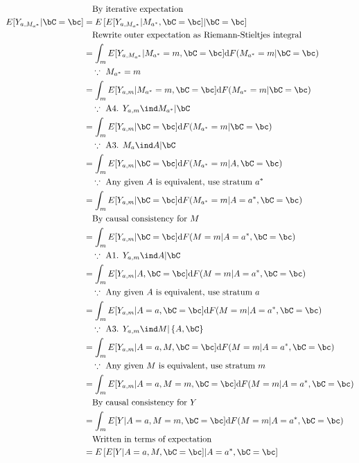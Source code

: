 \documentclass[10pt]{article}
\begin{document}
\begin{align*}
  &~~~\text{By iterative expectation}\\
  E[Y_{a,M_{a^{*}}} | \bC = \bc]
  &= E \left[ E[Y_{a,M_{a^{*}}} | M_{a^{*}}, \bC = \bc] | \bC = \bc \right]\\
  &~~~\text{Rewrite outer expectation as Riemann-Stieltjes integral}\\
  &= \int_{m} E[Y_{a,M_{a^{*}}} | M_{a^{*}} = m, \bC = \bc] \mathrm{d}F(M_{a^{*}} = m | \bC = \bc) \\
  &~~~\because~ M_{a^{*}} = m\\
  &= \int_{m} E[Y_{a,m} | M_{a^{*}} = m, \bC = \bc] \mathrm{d}F(M_{a^{*}} = m | \bC = \bc) \\
  &~~~\because~ \text{A4. } Y_{a,m} \ind M_{a^{*}} |\bC\\
  &= \int_{m} E[Y_{a,m} | \bC = \bc] \mathrm{d}F(M_{a^{*}} = m | \bC = \bc) \\
  &~~~\because~ \text{A3. } M_{a} \ind A | \bC\\
  &= \int_{m} E[Y_{a,m} | \bC = \bc] \mathrm{d}F(M_{a^{*}} = m | A, \bC = \bc) \\
  &~~~\because~ \text{Any given $A$ is equivalent, use stratum }a^{*}\\
  &= \int_{m} E[Y_{a,m} | \bC = \bc] \mathrm{d}F(M_{a^{*}} = m | A = a^{*}, \bC = \bc) \\
  &~~~\text{By causal consistency for }M\\
  &= \int_{m} E[Y_{a,m} | \bC = \bc] \mathrm{d}F(M = m | A = a^{*}, \bC = \bc) \\
  &~~~\because~ \text{A1. } Y_{a,m} \ind A | \bC\\
  &= \int_{m} E[Y_{a,m} | A, \bC = \bc] \mathrm{d}F(M = m | A = a^{*}, \bC = \bc) \\
  &~~~\because~ \text{Any given $A$ is equivalent, use stratum }a\\
  &= \int_{m} E[Y_{a,m} | A = a, \bC = \bc] \mathrm{d}F(M = m | A = a^{*}, \bC = \bc) \\
  &~~~\because~ \text{A3. } Y_{a,m} \ind M | \left\{ A, \bC \right\}\\
  &= \int_{m} E[Y_{a,m} | A = a, M, \bC = \bc] \mathrm{d}F(M = m | A = a^{*}, \bC = \bc) \\
  &~~~\because~ \text{Any given $M$ is equivalent, use stratum }m\\
  &= \int_{m} E[Y_{a,m} | A = a, M = m, \bC = \bc] \mathrm{d}F(M = m | A = a^{*}, \bC = \bc) \\
  &~~~\text{By causal consistency for }Y\\
  &= \int_{m} E[Y | A = a, M = m, \bC = \bc] \mathrm{d}F(M = m | A = a^{*}, \bC = \bc)\\
  &~~~\text{Written in terms of expectation}\\
  &= E \left[ E[Y | A = a, M, \bC = \bc] | A = a^{*}, \bC = \bc \right]\\
\end{align*}
\end{document}
